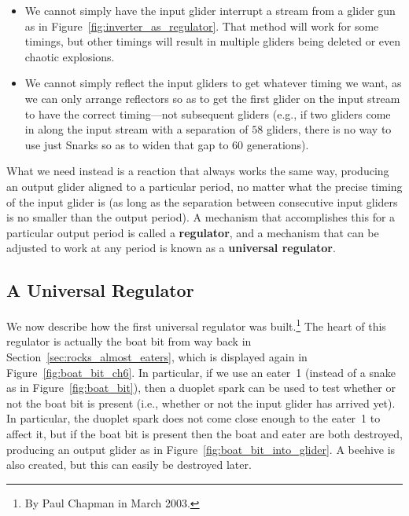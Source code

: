 \begin{itemize}
	\item We cannot simply have the input glider interrupt a stream from a glider gun as in Figure~\ref{fig:inverter_as_regulator}. That method will work for some timings, but other timings will result in multiple gliders being deleted or even chaotic explosions.\smallskip
	
	\item We cannot simply reflect the input gliders to get whatever timing we want, as we can only arrange reflectors so as to get the first glider on the input stream to have the correct timing---not subsequent gliders (e.g., if two gliders come in along the input stream with a separation of $58$ gliders, there is no way to use just Snarks so as to widen that gap to $60$ generations).\smallskip
\end{itemize}

What we need instead is a reaction that always works the same way, producing an output glider aligned to a particular period, no matter what the precise timing of the input glider is (as long as the separation between consecutive input gliders is no smaller than the output period). A mechanism that accomplishes this for a particular output period is called a \textbf{regulator}, and a mechanism that can be adjusted to work at any period is known as a \textbf{universal regulator}.


\subsection{A Universal Regulator}\label{sec:chapman_universal_regulator}

We now describe how the first universal regulator was built.\footnote{By Paul Chapman in March 2003.} The heart of this regulator is actually the boat bit from way back in Section~\ref{sec:rocks_almost_eaters}, which is displayed again in Figure~\ref{fig:boat_bit_ch6}. In particular, if we use an eater~1 (instead of a snake as in Figure~\ref{fig:boat_bit}), then a duoplet spark can be used to test whether or not the boat bit is present (i.e., whether or not the input glider has arrived yet). In particular, the duoplet spark does not come close enough to the eater~1 to affect it, but if the boat bit is present then the boat and eater are both destroyed, producing an output glider as in Figure~\ref{fig:boat_bit_into_glider}. A beehive is also created, but this can easily be destroyed later.

